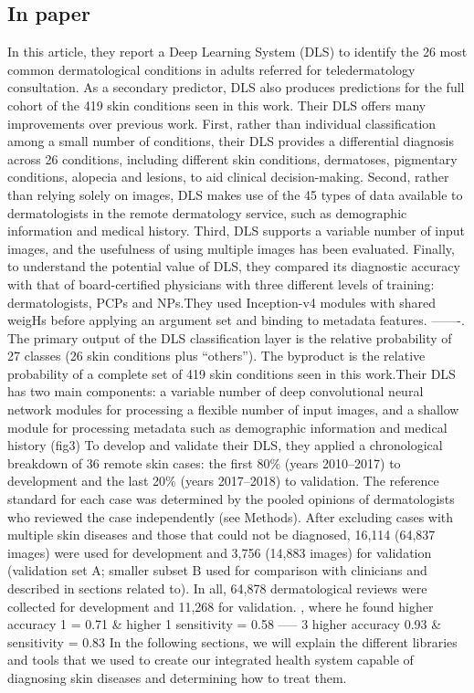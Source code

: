 \documentclass{article}
\begin{document}
\subsection{In paper\cite{r6}}In this article, they report a Deep Learning System (DLS) to identify the 26 most common dermatological conditions in adults referred for teledermatology consultation. As a secondary predictor, DLS also produces predictions for the full cohort of the 419 skin conditions seen in this work. Their DLS offers many improvements over previous work. First, rather than individual classification among a small number of conditions, their DLS provides a differential diagnosis across 26 conditions, including different skin conditions, dermatoses, pigmentary conditions, alopecia and lesions, to aid clinical decision-making. Second, rather than relying solely on images, DLS makes use of the 45 types of data available to dermatologists in the remote dermatology service, such as demographic information and medical history. Third, DLS supports a variable number of input images, and the usefulness of using multiple images has been evaluated. Finally, to understand the potential value of DLS, they compared its diagnostic accuracy with that of board-certified physicians with three different levels of training: dermatologists, PCPs and NPs.They used Inception-v4 modules with shared weigHs before applying an argument set and binding to metadata features. -------. The primary output of the DLS classification layer is the relative probability of 27 classes (26 skin conditions plus “others”). The byproduct is the relative probability of a complete set of 419 skin conditions seen in this work.Their DLS has two main components: a variable number of deep convolutional neural network modules for processing a flexible number of input images, and a shallow module for processing metadata such as demographic information and medical history (fig3)
To develop and validate their DLS, they applied a chronological breakdown of 36 remote skin cases: the first 80\% (years 2010–2017) to development and the last 20\% (years 2017–2018) to validation. The reference standard for each case was determined by the pooled opinions of dermatologists who reviewed the case independently (see Methods). After excluding cases with multiple skin diseases and those that could not be diagnosed, 16,114 (64,837 images) were used for development and 3,756 (14,883 images) for validation (validation set A; smaller subset B used for comparison with clinicians and described in sections related to). In all, 64,878 dermatological reviews were collected for development and 11,268 for validation. , where he found higher accuracy 1 = 0.71 \& higher 1 sensitivity = 0.58 ----- 3 higher accuracy 0.93 \& sensitivity = 0.83
In the following sections, we will explain the different libraries and tools that we used to create our integrated health system capable of diagnosing skin diseases and determining how to treat them.
\end{document}
